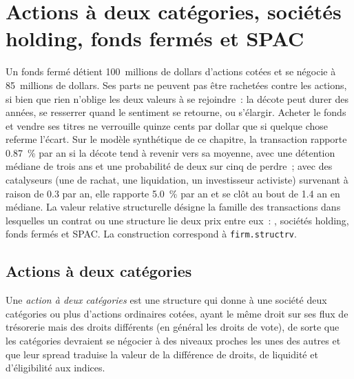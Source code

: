 \chapter{Actions à deux catégories, sociétés holding, fonds fermés et SPAC}\label{ch:s1:share-classes-holding-companies-closed-end-funds-spacs}

Un fonds fermé détient 100~millions de dollars d'actions cotées et se négocie à 85~millions de dollars. Ses parts ne peuvent pas être rachetées contre les actions, si bien que rien
n'oblige les deux valeurs à se rejoindre~: la décote peut durer des années, se resserrer quand le sentiment se retourne, ou s'élargir. Acheter le fonds et vendre ses titres
ne verrouille quinze cents par dollar que si quelque chose referme l'écart. Sur le modèle synthétique de ce chapitre, la transaction rapporte 0.87~\% par an si la décote tend
à revenir vers sa moyenne, avec une détention médiane de trois ans et une probabilité de deux sur cinq de perdre~; avec des catalyseurs (une  de rachat, une liquidation, un
investisseur activiste) survenant à raison de 0.3 par an, elle rapporte 5.0~\% par an et se clôt au bout de 1.4 an en médiane. La valeur relative structurelle désigne la famille des transactions dans lesquelles un
contrat ou une structure lie deux prix entre eux~: , sociétés holding, fonds fermés et SPAC. La
construction correspond à \texttt{firm.structrv}.

\section{Actions à deux catégories}

\begin{definition}\label{def:s1:share-classes-holding-companies-closed-end-funds-spacs:dual}
Une \emph{action à deux catégories} est une structure qui donne à une société deux catégories ou plus d'actions ordinaires cotées, ayant le même droit sur ses flux de trésorerie mais des droits différents
(en général les droits de vote), de sorte que les catégories devraient se négocier à des niveaux proches les unes des autres et que leur spread traduise la valeur de la différence de droits, de liquidité
et d'éligibilité aux indices.
\end{definition}

